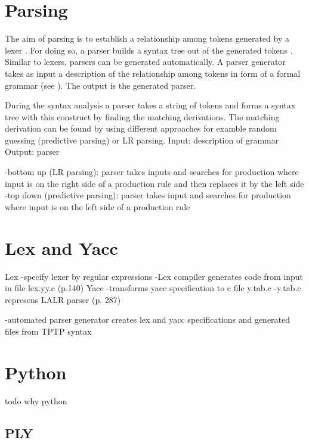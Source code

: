 

\section{Parsing}\label{sec:BackgroundParser}
The aim of parsing is to establish a relationship among tokens generated by a lexer \cite{LexYacc.1992}. For doing so, a parser builds a syntax tree out of the generated tokens \cite{Mogensen.2017}.\\
Similar to lexers, parsers can be generated automatically.
A parser generator takes as input a description of the relationship among tokens in form of a formal grammar (see ). The output is the generated parser. \cite{LexYacc.1992}

During the syntax analysis a parser takes a string of tokens and forms a syntax tree with this construct by finding the matching derivations. The matching derivation can be found by using different approaches for examble random guessing (predictive parsing) or LR parsing.
Input: description of grammar \cite{LexYacc.1992}
Output: parser \cite{LexYacc.1992}

-bottom up (LR parsing):
parser takes inputs and searches for production where input is on the right side of a production rule and then replaces it by the left side
-top down (predictive parsing):
parser takes input and searches for production where input is on the left side of a production rule
\section{Lex and Yacc}\label{sec:BackgroundLexYacc}
Lex
-specify lexer by regular expressions
-Lex compiler generates code from input in file lex.yy.c
(p.140)
Yacc
-transforms yacc specification to c file y.tab.c
-y.tab.c represens LALR parser
(p. 287)
\cite{Aho.2007}

-automated parser generator creates lex and yacc specifications and generated files from \ac{TPTP} syntax
\section{Python}\label{sec:BackgroundPython}
todo why python

\subsection{PLY}\label{sec:BackgroundPythonPLY}

